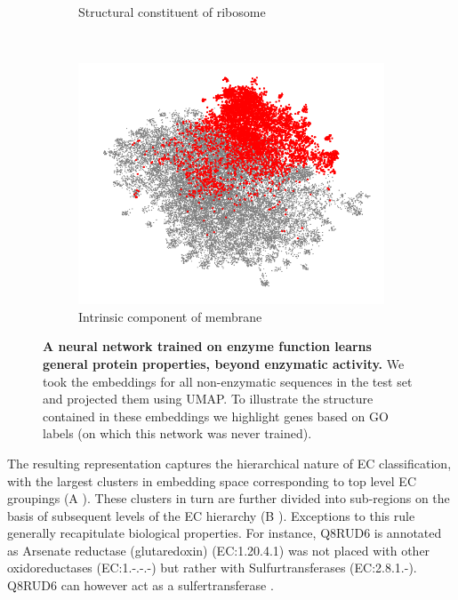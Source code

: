 \begin{figure}[t!]
\begin{subfigure}[t]{0.3\textwidth}
        \caption{Structural constituent of ribosome}
        \label{fig:tiger}
    \end{subfigure}
    ~ %
    \begin{subfigure}[t]{0.3\textwidth}
    \vskip 0pt
        \includegraphics[width=\textwidth]{Figures/membrane}
        \caption{Intrinsic component of membrane}
        \label{fig:mouse}
    \end{subfigure}
    \caption{\textbf{A neural network trained on enzyme function learns general protein properties, beyond enzymatic activity.} We took the embeddings for all non-enzymatic sequences in the test set and projected them using UMAP. To illustrate the structure contained in these embeddings we highlight genes based on GO labels (on which this network was never trained).}\label{fig:unsupervised_embedding}
\end{figure}
The resulting representation captures the hierarchical nature of EC classification, with the largest clusters in embedding space corresponding to top level EC groupings (A%
). These clusters in turn are further divided into sub-regions on the basis of subsequent levels of the EC hierarchy (B%
). Exceptions to this rule generally recapitulate biological properties. For instance, Q8RUD6 is annotated as Arsenate reductase (glutaredoxin) (EC:1.20.4.1) \cite{pmid25464340} was not placed with other oxidoreductases (EC:1.-.-.-) but rather with Sulfurtransferases (EC:2.8.1.-). Q8RUD6 can however act as a sulfertransferase \cite{pmid17408957}. 



